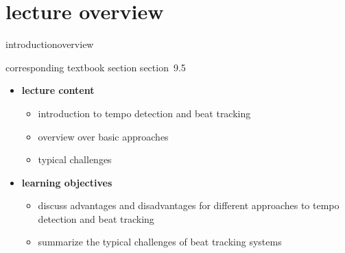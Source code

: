 


\subtitle{module 9.5: tempo detection}


	

    \section[overview]{lecture overview}
        \begin{frame}{introduction}{overview}
            \begin{block}{corresponding textbook section}
                    section~9.5
            \end{block}

            \begin{itemize}
                \item   \textbf{lecture content}
                    \begin{itemize}
                        \item   introduction to tempo detection and beat tracking
                        \item   overview over basic approaches
                        \item    typical challenges
                    \end{itemize}
                \bigskip
                \item<2->   \textbf{learning objectives}
                    \begin{itemize}
                        \item   discuss advantages and disadvantages for different approaches to tempo detection and beat tracking
                        \item   summarize the typical challenges of beat tracking systems
                    \end{itemize}
            \end{itemize}
        \end{frame}

